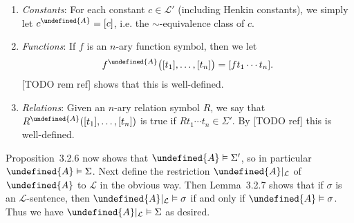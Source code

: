 \documentclass[article, a4paper, 11pt, oneside]{memoir}
\let\mathfrak\undefined
\numberwithin{equation}{chapter}
\newcommand{\calL}{\mathcal{L}}
\newcommand{\frakA}{\mathfrak{A}}
\theoremstyle{nonumberplain}
\begin{document}
\begin{notelist}
\begin{enumerate}
        \item \emph{Constants}: For each constant $c \in \calL'$ (including Henkin constants), we simply let $c^\frakA = [c]$, i.e. the $\sim$-equivalence class of $c$.

        \item \emph{Functions}: If $f$ is an $n$-ary function symbol, then we let
        \begin{equation*}
            f^\frakA \bigl( [t_1], \ldots, [t_n] \bigr)
                = [f t_1 \cdots t_n].
        \end{equation*}
        [TODO rem ref] shows that this is well-defined.

        \item \emph{Relations}: Given an $n$-ary relation symbol $R$, we say that $R^\frakA([t_1], \ldots, [t_n])$ is true if $R t_1 \cdots t_n \in \Sigma'$. By [TODO ref] this is well-defined.
    \end{enumerate}
    Proposition~3.2.6 now shows that $\frakA \models \Sigma'$, so in particular $\frakA \models \Sigma$. Next define the restriction $\frakA|_\calL$ of $\frakA$ to $\calL$ in the obvious way. Then Lemma~3.2.7 shows that if $\sigma$ is an $\calL$-sentence, then $\frakA|_\calL \models \sigma$ if and only if $\frakA \models \sigma$. Thus we have $\frakA|_\calL \models \Sigma$ as desired.
\end{notelist}
\end{document}

